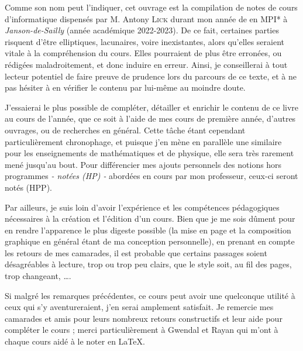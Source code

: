 \documentclass[a4paper,french,bookmarks]{book}
\begin{document}
    \newline\newline\newline
    
    \begin{center}
        \begin{minipage}{0.85\linewidth}
            \large \qquad Comme son nom peut l'indiquer, cet ouvrage est la compilation de notes de cours d'informatique dispensés par M. Antony
            \textsc{Lick} durant mon année de  en \textsf{MPI*} à \emph{Janson-de-Sailly} (année académique 2022-2023). De ce fait,
            certaines parties risquent d'être elliptiques, lacunaires, voire inexistantes, alors qu'elles seraient vitale à la compréhension du
            cours. Elles pourraient de plus être erronées, ou rédigées maladroitement, et donc induire en erreur. Ainsi, je conseillerai à tout
            lecteur potentiel de faire preuve de prudence lors du parcours de ce texte, et à ne pas hésiter à en vérifier le contenu par lui-même
            au moindre doute.\newline
            
            J'essaierai le plus possible de compléter, détailler et enrichir le contenu de ce livre au cours de l'année, que ce soit à l'aide de
            mes cours de première année, d'autres ouvrages, ou de recherches en général. Cette tâche étant cependant particulièrement chronophage,
            et puisque j'en mène en parallèle une similaire pour les enseignements de mathématiques et de physique, elle sera très rarement mené
            jusqu'au bout. Pour différencier mes ajouts personnels des notions hors programmes \emph{- notées (HP) -} abordées en cours par mon
            professeur, ceux-ci seront notés (HPP).\newline
            
            Par ailleurs, je suis loin d'avoir l'expérience et les compétences pédagogiques nécessaires à la création et l'édition d'un cours. Bien
            que je me sois dûment pour en rendre l'apparence le plus digeste possible (la mise en page et la composition graphique en général étant
            de ma conception personnelle), en prenant en compte les retours de mes camarades, il est probable que certains passages soient
            désagréables à lecture, trop  ou trop peu clairs, que le style soit, au fil des pages, trop changeant, \etc
            \dots.\newline
    
            Si malgré les remarques précédentes, ce cours peut avoir une quelconque utilité à ceux qui s'y aventureraient, j'en serai amplement
            satisfait. Je remercie mes camarades et amis pour leurs nombreux retours constructifs et leur aide pour compléter le cours ; merci
            particulièrement à Gwendal et Rayan qui m'ont à chaque cours aidé à le noter en \LaTeX. \newline\newline\newline\text{}
        \end{minipage}
    \end{center}
    
\end{document}
